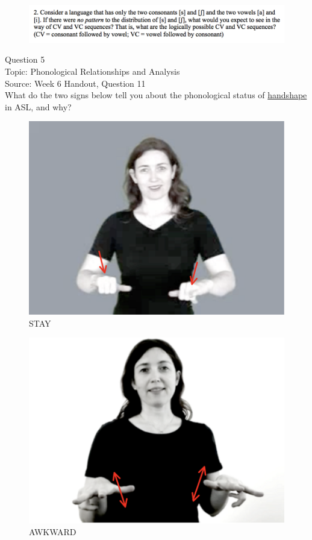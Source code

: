 \documentclass[12pt]{article}
\begin{document}
\begin{figure}[H]
\includegraphics{../images/skew2.png}
\end{figure}

\newpage

{\large Question 5}\\

Topic: Phonological Relationships and Analysis\\
Source: Week 6 Handout, Question 11\\

What do the two signs below tell you about the phonological status of \underline{handshape} in ASL, and why?\\

\begin{figure}[H]
\includegraphics{../images/asl_stay.png}
\caption{STAY}
\end{figure}
\begin{figure}[H]
\includegraphics{../images/asl_awkward.png}
\caption{AWKWARD}
\end{figure}
\end{document}
